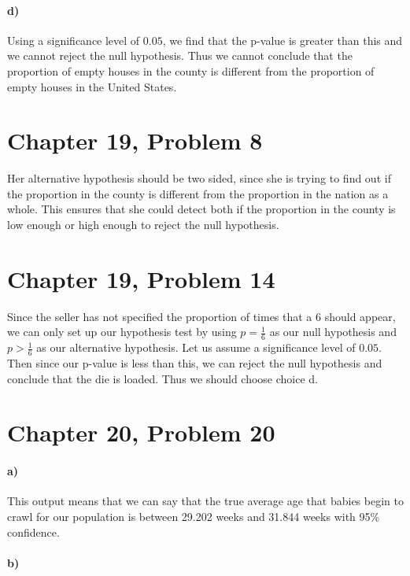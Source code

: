 \documentclass[12pt]{article}
\begin{document}
\paragraph{d)}

Using a significance level of \(0.05\), we find that the p-value is greater than this and we cannot reject the null hypothesis.
Thus we cannot conclude that the proportion of empty houses in the county is different from the proportion of empty houses in the
United States.

\section*{Chapter 19, Problem 8}

Her alternative hypothesis should be two sided, since she is trying to find out if the proportion in the county is
different from the proportion in the nation as a whole. This ensures that she could detect both if the proportion in the
county is low enough or high enough to reject the null hypothesis.

\section*{Chapter 19, Problem 14}

Since the seller has not specified the proportion of times that a 6 should appear, we can only set up our hypothesis
test by using \(p=\frac{1}{6}\) as our null hypothesis and \(p>\frac{1}{6}\) as our alternative hypothesis. Let
us assume a significance level of \(0.05\). Then since our p-value is less than this, we can reject the null hypothesis
and conclude that the die is loaded. Thus we should choose choice d. 

\section*{Chapter 20, Problem 20}

\paragraph{a)}

This output means that we can say that the true average age that babies begin to crawl for our population is
between 29.202 weeks and 31.844 weeks with 95\% confidence.

\paragraph{b)}
\end{document}
